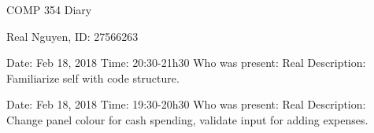\documentclass{article}
\begin{document}
 
\begin{center}
    COMP 354 Diary
\end{center}
 
\begin{center}
    Real Nguyen, ID: 27566263
\end{center}
 
\begin{flushleft}
Date: Feb 18, 2018 \newline
Time: 20:30-21h30 \newline
Who was present: Real\newline
Description: Familiarize self with code structure.\newline
\end{flushleft}
 
\begin{flushleft}
Date: Feb 18, 2018 \newline
Time: 19:30-20h30 \newline
Who was present: Real\newline
Description: Change panel colour for cash spending, validate input for adding expenses.\newline
\end{flushleft}
 
\end{document}
